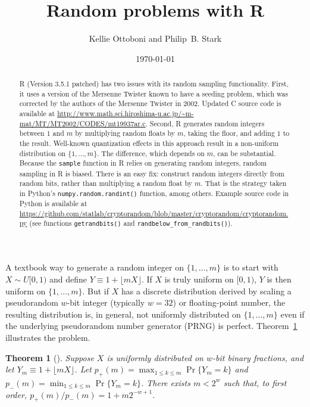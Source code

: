 \documentclass[12pt]{article}
\title{Random problems with R}
\author{Kellie Ottoboni and Philip~B. Stark}
\date{\today}
\newtheorem{theorem}{Theorem}
\begin{document}
\maketitle


\begin{abstract}
\noindent R (Version 3.5.1 patched) has two issues with its random sampling functionality.
First, it uses a version of the Mersenne Twister known to have
a seeding problem, which was corrected by the authors of the Mersenne Twister in 2002.
Updated C source code is available at \url{http://www.math.sci.hiroshima-u.ac.jp/~m-mat/MT/MT2002/CODES/mt19937ar.c}.
Second, R generates random integers between $1$ and $m$
by multiplying random floats by $m$, taking the floor, and adding $1$ to the result.
Well-known quantization effects in this approach result in a 
non-uniform distribution on $\{ 1, \ldots, m\}$.
The difference, which depends on $m$, can be substantial.
Because the \texttt{sample} function in R relies on generating random integers,
random sampling in R is biased.
There is an easy fix: construct random integers directly from random bits, rather than
multiplying a random float by $m$.
That is the strategy taken in Python's \texttt{numpy.random.randint()} function, among
others.
Example source code in Python is available at \url{https://github.com/statlab/cryptorandom/blob/master/cryptorandom/cryptorandom.py} (see functions \texttt{getrandbits()} and \texttt{randbelow\_from\_randbits()}).
\end{abstract}



A textbook way to generate a random integer on 
$\{1, \dots, m\}$ is to start with $X \sim U[0,1)$ and define $Y \equiv 1 + \lfloor mX \rfloor$. 
If $X$ is truly uniform on $[0,1)$, $Y$ is then uniform on $\{1, \dots, m\}$.
But if $X$ has a discrete distribution derived by scaling a pseudorandom $w$-bit integer
(typically $w=32$) or floating-point number, 
the resulting distribution is, in general, not uniformly distributed on 
$\{1, \ldots, m \}$ even if the underlying pseudorandom number generator 
(PRNG) is perfect.
Theorem~\ref{thm:theorem_1} illustrates the problem.

\begin{theorem}[\citet{knuth_art_1997}] %
\label{thm:theorem_1}
Suppose $X$ is uniformly distributed on $w$-bit binary fractions, and
let $Y_m \equiv 1 + \lfloor mX \rfloor$.
Let $p_+(m) = \max_{1 \le k \le m} \Pr\{Y_m = k\}$ and $p_-(m) = \min_{1 \le k \le m} \Pr\{Y_m = k\}$.
There exists $m < 2^w$ such that, to first order, 
$p_+(m)/p_-(m) = 1 + m2^{-w+1}$.
\end{theorem}
\end{document}

